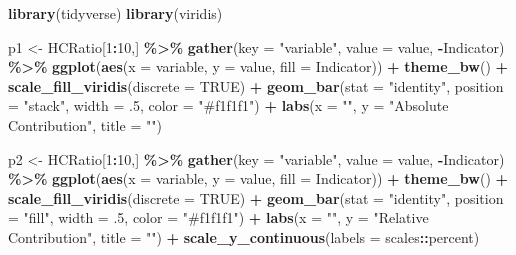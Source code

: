 \documentclass[
]{book}
\newenvironment{Shaded}{\begin{snugshade}}{\end{snugshade}}
\newcommand{\DataTypeTok}[1]{\textcolor[rgb]{0.13,0.29,0.53}{#1}}
\newcommand{\DecValTok}[1]{\textcolor[rgb]{0.00,0.00,0.81}{#1}}
\newcommand{\FloatTok}[1]{\textcolor[rgb]{0.00,0.00,0.81}{#1}}
\newcommand{\KeywordTok}[1]{\textcolor[rgb]{0.13,0.29,0.53}{\textbf{#1}}}
\newcommand{\NormalTok}[1]{#1}
\newcommand{\OperatorTok}[1]{\textcolor[rgb]{0.81,0.36,0.00}{\textbf{#1}}}
\newcommand{\OtherTok}[1]{\textcolor[rgb]{0.56,0.35,0.01}{#1}}
\newcommand{\StringTok}[1]{\textcolor[rgb]{0.31,0.60,0.02}{#1}}
\begin{document}
\begin{Shaded}
\begin{Highlighting}[]
\KeywordTok{library}\NormalTok{(tidyverse)}
\KeywordTok{library}\NormalTok{(viridis)}

\NormalTok{p1 \textless{}{-}}\StringTok{ }\NormalTok{HCRatio[}\DecValTok{1}\OperatorTok{:}\DecValTok{10}\NormalTok{,] }\OperatorTok{\%\textgreater{}\%}\StringTok{ }
\StringTok{  }\KeywordTok{gather}\NormalTok{(}\DataTypeTok{key =} \StringTok{"variable"}\NormalTok{, }\DataTypeTok{value =}\NormalTok{ value, }\OperatorTok{{-}}\NormalTok{Indicator) }\OperatorTok{\%\textgreater{}\%}\StringTok{ }
\StringTok{  }\KeywordTok{ggplot}\NormalTok{(}\KeywordTok{aes}\NormalTok{(}\DataTypeTok{x =}\NormalTok{ variable, }\DataTypeTok{y =}\NormalTok{ value, }\DataTypeTok{fill =}\NormalTok{ Indicator)) }\OperatorTok{+}
\StringTok{  }\KeywordTok{theme\_bw}\NormalTok{() }\OperatorTok{+}
\StringTok{  }\KeywordTok{scale\_fill\_viridis}\NormalTok{(}\DataTypeTok{discrete =} \OtherTok{TRUE}\NormalTok{) }\OperatorTok{+}
\StringTok{  }\KeywordTok{geom\_bar}\NormalTok{(}\DataTypeTok{stat =} \StringTok{"identity"}\NormalTok{, }\DataTypeTok{position =} \StringTok{"stack"}\NormalTok{, }\DataTypeTok{width =} \FloatTok{.5}\NormalTok{, }\DataTypeTok{color =} \StringTok{"\#f1f1f1"}\NormalTok{) }\OperatorTok{+}\StringTok{ }
\StringTok{  }\KeywordTok{labs}\NormalTok{(}\DataTypeTok{x =} \StringTok{""}\NormalTok{, }\DataTypeTok{y =} \StringTok{"Absolute Contribution"}\NormalTok{, }\DataTypeTok{title =} \StringTok{""}\NormalTok{)}

\NormalTok{p2 \textless{}{-}}\StringTok{ }\NormalTok{HCRatio[}\DecValTok{1}\OperatorTok{:}\DecValTok{10}\NormalTok{,] }\OperatorTok{\%\textgreater{}\%}\StringTok{ }
\StringTok{  }\KeywordTok{gather}\NormalTok{(}\DataTypeTok{key =} \StringTok{"variable"}\NormalTok{, }\DataTypeTok{value =}\NormalTok{ value, }\OperatorTok{{-}}\NormalTok{Indicator) }\OperatorTok{\%\textgreater{}\%}\StringTok{ }
\StringTok{  }\KeywordTok{ggplot}\NormalTok{(}\KeywordTok{aes}\NormalTok{(}\DataTypeTok{x =}\NormalTok{ variable, }\DataTypeTok{y =}\NormalTok{ value, }\DataTypeTok{fill =}\NormalTok{ Indicator)) }\OperatorTok{+}
\StringTok{  }\KeywordTok{theme\_bw}\NormalTok{() }\OperatorTok{+}
\StringTok{  }\KeywordTok{scale\_fill\_viridis}\NormalTok{(}\DataTypeTok{discrete =} \OtherTok{TRUE}\NormalTok{) }\OperatorTok{+}
\StringTok{  }\KeywordTok{geom\_bar}\NormalTok{(}\DataTypeTok{stat =} \StringTok{"identity"}\NormalTok{, }\DataTypeTok{position =} \StringTok{"fill"}\NormalTok{, }\DataTypeTok{width =} \FloatTok{.5}\NormalTok{, }\DataTypeTok{color =} \StringTok{"\#f1f1f1"}\NormalTok{) }\OperatorTok{+}
\StringTok{  }\KeywordTok{labs}\NormalTok{(}\DataTypeTok{x =} \StringTok{""}\NormalTok{, }\DataTypeTok{y =} \StringTok{"Relative Contribution"}\NormalTok{, }\DataTypeTok{title =} \StringTok{""}\NormalTok{) }\OperatorTok{+}
\StringTok{  }\KeywordTok{scale\_y\_continuous}\NormalTok{(}\DataTypeTok{labels =}\NormalTok{ scales}\OperatorTok{::}\NormalTok{percent)}


\end{Highlighting}
\end{Shaded}
\end{document}
